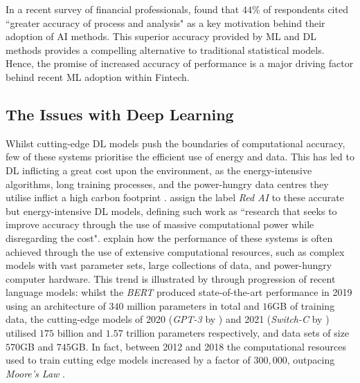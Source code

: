 \documentclass[a4paper, 11pt]{report}
\begin{document}
    In a recent survey of financial professionals, \citet{chartis-2019} found that $44\%$ of respondents cited ``greater accuracy of process and analysis" as a key motivation behind their adoption of AI methods. This superior accuracy provided by ML and DL methods provides a compelling alternative to traditional statistical models. Hence, the promise of increased accuracy of performance is a major driving factor behind recent ML adoption within Fintech.


    \subsection{The Issues with Deep Learning}

    Whilst cutting-edge DL models push the boundaries of computational accuracy, few of these systems prioritise the efficient use of energy and data. This has led to DL inflicting a great cost upon the environment, as the energy-intensive algorithms, long training processes, and the power-hungry data centres they utilise inflict a high carbon footprint \citep{lacoste-2019}. \citet{schwartz-2019} assign the label \emph{Red AI} to these accurate but energy-intensive DL models, defining such work as ``research that seeks to improve accuracy through the use of massive computational power while disregarding the cost". \citeauthor{schwartz-2019} explain how the performance of these systems is often achieved through the use of extensive computational resources, such as complex models with vast parameter sets, large collections of data, and power-hungry computer hardware. This trend is illustrated by \citet{bender-2021} through progression of recent language models: whilst the \emph{BERT} \citep{devlin-2018} produced state-of-the-art performance in 2019 using an architecture of $340$ million parameters in total and $16$GB of training data, the cutting-edge models of 2020 (\emph{GPT-3} by \citet{brown-2020}) and 2021 (\emph{Switch-C} by \citet{fedus-2021}) utilised $175$ billion and $1.57$ trillion parameters respectively, and data sets of size $570$GB and $745$GB. In fact, between 2012 and 2018 the computational resources used to train cutting edge models increased by a factor of $300,000$, outpacing \emph{Moore's Law} \citep{amodei-2018}.
\end{document}
